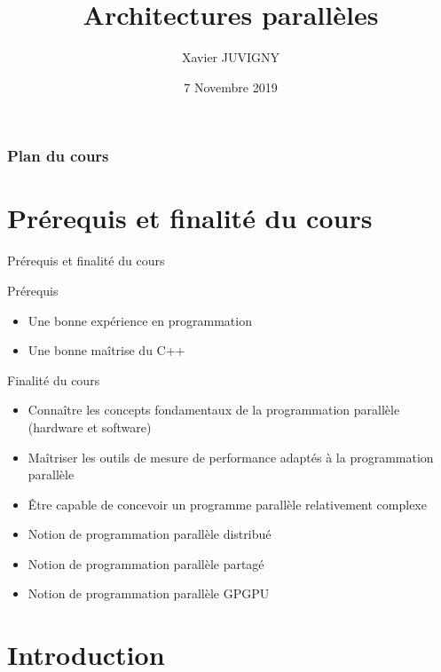 \documentclass[handout]{beamer}
\title[Architectures parallèles\hspace{2em}]{Architectures parallèles}
\author[Xavier JUVIGNY]{Xavier JUVIGNY}
\date{7 Novembre 2019}
\institute{ONERA}
\begin{document}
\lstset{escapechar=@,style=customcpp}

\begin{frame}
 \titlepage
\end{frame}

\begin{frame}
\frametitle{Plan du cours}
\tableofcontents
\end{frame}

\section{Prérequis et finalité du cours}

\begin{frame}[fragile]{Prérequis et finalité du cours}

  \begin{block}{Prérequis}
    \begin{itemize}
      \item Une bonne expérience en programmation
      \item Une bonne maîtrise du C++
    \end{itemize}
  \end{block}
  
  \begin{block}{Finalité du cours}
    \begin{itemize}
    \item Connaître les concepts fondamentaux de la programmation parallèle (hardware et software)
    \item Maîtriser les outils de mesure de performance adaptés à la programmation parallèle
    \item Être capable de concevoir un programme parallèle relativement complexe
    \item Notion de programmation parallèle distribué
    \item Notion de programmation parallèle partagé
    \item Notion de programmation parallèle GPGPU
    \end{itemize}
  \end{block}

\end{frame}

\section{Introduction}
\end{document}
